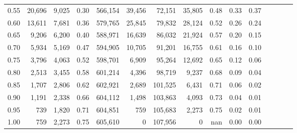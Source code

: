 \begin{tabular}{rrrcrrrrrrrrrrr}
0.55 &  20,696 &   9,025 &                                       0.30 &  566,154 &   39,456 &   72,151 &   35,805 &  0.48 &  0.33 &                         0.37 \\
0.60 &  13,611 &   7,681 &                                       0.36 &  579,765 &   25,845 &   79,832 &   28,124 &  0.52 &  0.26 &                         0.24 \\
0.65 &   9,206 &   6,200 &                                       0.40 &  588,971 &   16,639 &   86,032 &   21,924 &  0.57 &  0.20 &                         0.15 \\
0.70 &   5,934 &   5,169 &                                       0.47 &  594,905 &   10,705 &   91,201 &   16,755 &  0.61 &  0.16 &                         0.10 \\
0.75 &   3,796 &   4,063 &                                       0.52 &  598,701 &    6,909 &   95,264 &   12,692 &  0.65 &  0.12 &                         0.06 \\
0.80 &   2,513 &   3,455 &                                       0.58 &  601,214 &    4,396 &   98,719 &    9,237 &  0.68 &  0.09 &                         0.04 \\
0.85 &   1,707 &   2,806 &                                       0.62 &  602,921 &    2,689 &  101,525 &    6,431 &  0.71 &  0.06 &                         0.02 \\
0.90 &   1,191 &   2,338 &                                       0.66 &  604,112 &    1,498 &  103,863 &    4,093 &  0.73 &  0.04 &                         0.01 \\
0.95 &     739 &   1,820 &                                       0.71 &  604,851 &      759 &  105,683 &    2,273 &  0.75 &  0.02 &                         0.01 \\
1.00 &     759 &   2,273 &                                       0.75 &  605,610 &        0 &  107,956 &        0 &   nan &  0.00 &                         0.00 \\
\bottomrule
\end{tabular}
